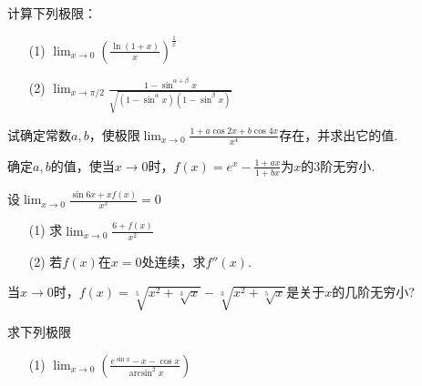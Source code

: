 \begin{xiti}
\item 计算下列极限：
\begin{enumerate}
	\item[(1)] $\lim _ { x \rightarrow 0 } \left( \frac { \ln ( 1 + x ) } { x } \right) ^ { \frac { 1 } { x } }$
	\item[(2)] $\lim _ { x \rightarrow \pi / 2 } \frac { 1 - \sin ^ { \alpha + \beta } x } { \sqrt { \left( 1 - \sin ^ { \alpha } x \right) \left( 1 - \sin ^ { \beta } x \right) } }$
\end{enumerate}
\item 试确定常数$a,b$，使极限$\lim _ { x \rightarrow 0 } \frac { 1 + a \cos 2 x + b \cos 4 x } { x ^ { 4 } }$存在，并求出它的值.
\item 确定$a,b$的值，使当$x\rightarrow0$时，$f ( x ) = e ^ { x } - \frac { 1 + a x } { 1 + b x }$为$x$的$3$阶无穷小.
\item 设$\lim _ { x \rightarrow 0 } \frac { \sin 6 x + x f ( x ) } { x ^ { 3 } } = 0$
\begin{enumerate}
	\item[(1)] 求$\lim _ { x \rightarrow 0 } \frac { 6 + f ( x ) } { x ^ { 2 } }$
	\item[(2)] 若$f(x)$在$x=0$处连续，求$f''(x)$.
\end{enumerate}
\item 当$ x \rightarrow 0$时，$f ( x ) = \sqrt [ 5 ] { x ^ { 2 } + \sqrt [ 3 ] { x } } - \sqrt [ 3 ] { x ^ { 2 } + \sqrt [ 5 ] { x } }$是关于$x$的几阶无穷小?
\item 求下列极限
\begin{enumerate}
	\item[(1)] $\lim _ { x \rightarrow 0 } \left( \frac {e ^ { \sin x } - x - \cos x } { \arcsin ^ { 2 } x } \right)$

\end{enumerate}
\end{xiti}
